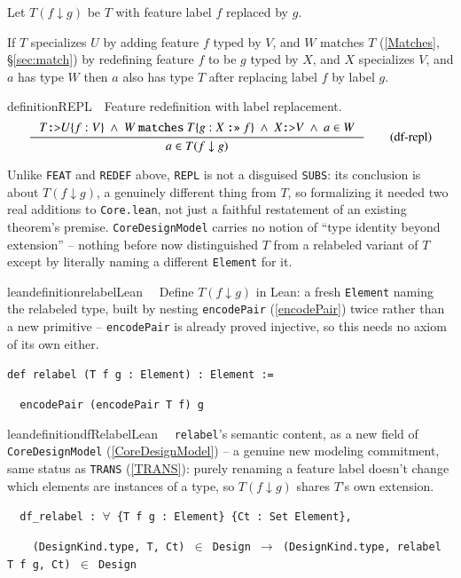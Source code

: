 Let $T(f \downarrow g)$ be $T$ with feature label $f$ replaced by $g$.

If $T$ specializes $U$ by adding feature $f$ typed by $V$, and $W$ matches $T$ (\ref{Matches},
\S\ref{sec:match}) by redefining feature $f$ to be $g$ typed by $X$, and $X$ specializes $V$, and $a$
has type $W$ then $a$ also has type $T$ after replacing label $f$ by label $g$.
\begin{restatable}{definition}{REPL}~~Feature redefinition with label replacement.
\begin{align}
\inference
{T\texttt{:>}U\{f:V\}~\wedge~W~\texttt{matches}~T\{g:X~\texttt{:>>}~f\}~\wedge~X\texttt{:>}V ~\wedge~a \in W}
{a \in T(f \downarrow g)}
\label{eq:df-repl}\tag{df-repl}
\end{align}
\end{restatable}

\pn Unlike \texttt{FEAT} and \texttt{REDEF} above, \texttt{REPL} is not a disguised \texttt{SUBS}:
its conclusion is about $T(f \downarrow g)$, a genuinely different thing from $T$, so formalizing it
needed two real additions to \texttt{Core.lean}, not just a faithful restatement of an existing
theorem's premise. \texttt{CoreDesignModel} carries no notion of ``type identity beyond extension'' --
nothing before now distinguished $T$ from a relabeled variant of $T$ except by literally naming a
different \texttt{Element} for it.

\begin{restatable}{leandefinition}{relabelLean}~~ Define $T(f \downarrow g)$ in
Lean: a fresh \texttt{Element} naming the relabeled type, built by nesting \texttt{encodePair}
(\ref{encodePair}) twice rather than a new primitive -- \texttt{encodePair} is already proved
injective, so this needs no axiom of its own either.

\texttt{\textcolor{leancolor}{def} \textcolor{leanyellow}{relabel} (T f g : Element) : Element :=}

\texttt{~~encodePair (encodePair T f) g}
\label{relabel}
\end{restatable}

\begin{restatable}{leandefinition}{dfRelabelLean}~~ \texttt{relabel}'s
semantic content, as a new field of \texttt{CoreDesignModel} (\ref{CoreDesignModel}) -- a genuine new
modeling commitment, same status as \texttt{TRANS} (\ref{TRANS}): purely renaming a feature label
doesn't change which elements are instances of a type, so $T(f \downarrow g)$ shares $T$'s own
extension.

\texttt{~~df\_relabel : $\forall$ \{T f g : Element\} \{Ct : Set Element\},}

\texttt{~~~~(DesignKind.type, T, Ct) $\in$ Design $\to$ (DesignKind.type, relabel T f g, Ct) $\in$ Design}
\label{df_relabel}
\end{restatable}

